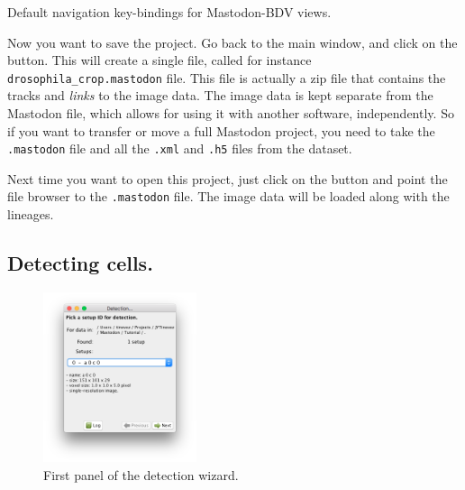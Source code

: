 \begin{table}[!htbp]
    \centering
    
    \caption{Default navigation key-bindings for Mastodon-BDV views.}

    

    \label{tab:MastodonBDVNavigationKeys}
    \vspace{-10pt}

\end{table}

Now you want to save the project. 
Go back to the main window, and click on the  button.
This will create a single file, called for instance \texttt{drosophila\_crop.mastodon} file. 
This file is actually a zip file that contains the tracks and \textit{links} to the image data.
The image data is kept separate from the Mastodon file, which allows for using it with another software, independently. 
So if you want to transfer or move a full Mastodon project, you need to take the \texttt{.mastodon} file and all the \texttt{.xml} and \texttt{.h5} files from the \Bdv dataset.

Next time you want to open this project, just click on the  button and point the file browser to the \texttt{.mastodon} file.
The image data will be loaded along with the lineages.



\subsection{Detecting cells.}
\label{sec:DetectingCells}

\begin{figure}
    \centering
     \includegraphics[width=0.4\textwidth]{figures/Mastodon_DetectionWizard_01.png}
     \caption{First panel of the detection wizard.}
     \label{fig:DetectionWizardFirstPanel}
\end{figure}

